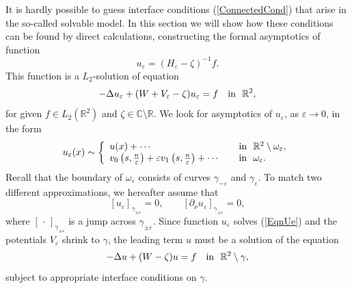 \documentclass[graybox]{svmult}
\newcommand{\Real}{\mathbb R}
\newcommand{\eps}{\varepsilon}
\newcommand\nep{\textstyle\frac n\eps}
\newcommand{\eqref}[1]{(\ref{#1})}
\begin{document}
It is hardly possible to guess interface conditions \eqref{ConnectedCond}
that arise in the so-called solvable model. In this section we will show how these conditions can be found by direct calculations, constructing the formal asymptotics of  function
\begin{equation}\label{Ueps}
u_\eps=(H_\eps-\zeta)^{-1}f.
\end{equation}
This function is a $L_2$-solution of equation
\begin{equation}\label{EqnUe}
-\Delta u_\eps +(W+V_\eps-\zeta) u_\eps= f\quad \hbox{in \ } \Real^2,
\end{equation}
for given $f\in L_2(\Real^2)$ and $\zeta\in \mathbb{C}\setminus\Real$.
We  look for asymptotics of $u_\eps$, as $\eps\to 0$, in the form
\begin{equation}\label{AsymptoticsWe}
u_\eps(x)\sim
\left\{
  \begin{array}{ll}
    u(x)+\cdots&\quad \hbox{in \ }\Real^2\setminus \omega_\eps, \\
    v_0\left(s,\nep\right)+\eps v_1\left(s,\nep\right)+\cdots
&\quad \hbox{in \ } \omega_\eps.
  \end{array}
\right.
\end{equation}
Recall that the boundary of $\omega_\eps$ consists of  curves
$\gamma_{-\eps}$ and $\gamma_{\eps}$.
To match two different approximations, we hereafter assume that
\begin{equation}\label{MatchingCnds}
  [u_\eps]_{\gamma_{\pm\eps}}=0, \qquad [\partial_\nu u_\eps]_{\gamma_{\pm\eps}}=0,
\end{equation}
where $[\,\cdot\,]_{\gamma_{\pm\eps}}$ is a jump  across $\gamma_{\pm\eps}$.
Since function $u_\eps$ solves \eqref{EqnUe} and the potentials $V_\eps$ shrink to $\gamma$, the leading term $u$ must be a solution of the equation
$$
-\Delta u+(W-\zeta)u= f \quad \hbox{in \ } \Real^2\setminus \gamma,
$$
subject to appropriate interface conditions on $\gamma$.
\end{document}

